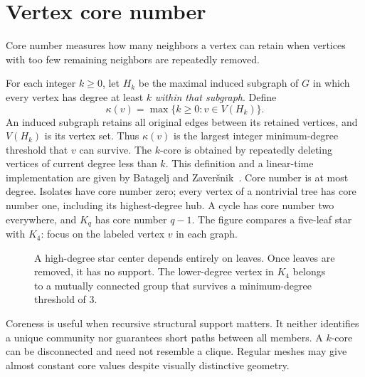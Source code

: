 \documentclass[11pt]{article}
\newcommand{\plain}[1]{\noindent #1\par\smallskip}
\begin{document}
\section{Vertex core number}
\plain{Core number measures how many neighbors a vertex can retain when vertices with too few remaining neighbors are repeatedly removed.}
For each integer $k\geq0$, let $H_k$ be the maximal induced subgraph of $G$ in which every vertex has degree at least $k$ \emph{within that subgraph}. Define
\begin{equation}
 \kappa(v)=\max\{k\geq0:v\in V(H_k)\}.
\end{equation}
An induced subgraph retains all original edges between its retained vertices, and $V(H_k)$ is its vertex set. Thus $\kappa(v)$ is the largest integer minimum-degree threshold that $v$ can survive. The $k$-core is obtained by repeatedly deleting vertices of current degree less than $k$. This definition and a linear-time implementation are given by Batagelj and Zaver\v{s}nik~\cite{cores}. Core number is at most degree. Isolates have core number zero; every vertex of a nontrivial tree has core number one, including its highest-degree hub. A cycle has core number two everywhere, and $K_q$ has core number $q-1$. The figure compares a five-leaf star with $K_4$: focus on the labeled vertex $v$ in each graph.
\par
\begin{figure}[H]\centering
{}
\caption{A high-degree star center depends entirely on leaves. Once leaves are removed, it has no support. The lower-degree vertex in $K_4$ belongs to a mutually connected group that survives a minimum-degree threshold of 3.}
\end{figure}
\par
Coreness is useful when recursive structural support matters. It neither identifies a unique community nor guarantees short paths between all members. A $k$-core can be disconnected and need not resemble a clique. Regular meshes may give almost constant core values despite visually distinctive geometry.
\end{document}
